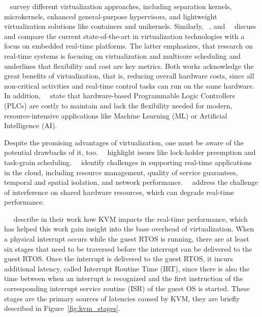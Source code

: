 \documentclass[MMR,Master,english]{twbook}
\begin{document}
\bigskip \noindent \citeauthor{cinqueVirtualizingMixedCriticalitySystems2022}~\cite{cinqueVirtualizingMixedCriticalitySystems2022} survey different virtualization approaches, including separation kernels, microkernels, enhanced general-purpose hypervisors, and lightweight virtualization solutions like containers and unikernels. Similarly, \citeauthor{sandstromVirtualizationTechnologiesEmbedded2013}~\cite{sandstromVirtualizationTechnologiesEmbedded2013}, and~\citeauthor{taccariEmbeddedRealTimeVirtualization2014}~\cite{taccariEmbeddedRealTimeVirtualization2014} discuss and compare the current state-of-the-art in virtualization technologies with a focus on embedded real-time platforms. The latter emphasizes, that research on real-time systems is focusing on virtualization and multicore scheduling and underlines that flexibility and cost are key metrics. Both works acknowledge the great benefits of virtualization, that is, reducing overall hardware costs, since all non-critical activities and real-time control tasks can run on the same hardware. In addition,~\citeauthor{javierperezHowRealTime2022}~\cite{javierperezHowRealTime2022} state that hardware-based Programmable Logic Controllers (PLCs) are costly to maintain and lack the flexibility needed for modern, resource-intensive applications like Machine Learning (ML) or Artificial Intelligence (AI).

\bigskip \noindent Despite the promising advantages of virtualization, one must be aware of the potential drawbacks of it, too.~\citeauthor{guStateoftheArtSurveyRealTime2012}~\cite{guStateoftheArtSurveyRealTime2012} highlight issues like lock-holder preemption and task-grain scheduling.~\citeauthor{garcia-vallsChallengesRealtimeVirtualization2014}~\cite{garcia-vallsChallengesRealtimeVirtualization2014} identify challenges in supporting real-time applications in the cloud, including resource management, quality of service guarantees, temporal and spatial isolation, and network performance.~\citeauthor{scordinoRealTimeVirtualizationIndustrial2020}~\cite{scordinoRealTimeVirtualizationIndustrial2020} address the challenge of interference on shared hardware resources, which can degrade real-time performance.

\bigskip \noindent \citeauthor{maPerformanceTuningKVMbased}~\cite{maPerformanceTuningKVMbased}~\cite{junzhangPerformanceAnalysisKVMBased2010} describe in their work how KVM impacts the real-time performance, which has helped this work gain insight into the base overhead of virtualization. When a physical interrupt occurs while the guest RTOS is running, there are at least six stages that need to be traversed before the interrupt can be delivered to the guest RTOS. Once the interrupt is delivered to the guest RTOS, it incurs additional latency, called Interrupt Routine Time (IRT), since there is also the time between when an interrupt is recognized and the first instruction of the corresponding interrupt service routine (ISR) of the guest OS is started. These stages are the primary sources of latencies caused by KVM, they are briefly described in Figure~\ref{fig:kvm_stages}.
\end{document}
